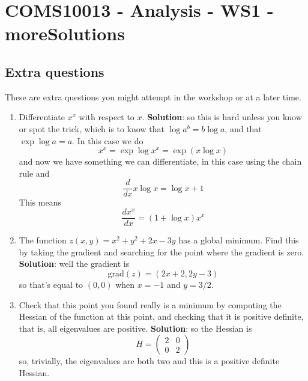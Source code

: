 \documentclass[11pt,a4paper]{scrartcl}
\begin{document}
\section*{COMS10013 - Analysis - WS1 - moreSolutions}

\subsection*{Extra questions}

These are extra questions you might attempt in the workshop or at a later time.

\begin{enumerate}

\item Differentiate $x^x$ with respect to $x$. \textbf{Solution}: so this is hard unless you know or spot the trick, which is to know that $\log a^b=b\log a$, and that $\exp{\log{a}}=a$. In this case we do
  \begin{equation}
    x^x=\exp{\log{x^x}}=\exp{\left(x\log{x}\right)}
  \end{equation}
  and now we have something we can differentiate, in this case using the chain rule and
  \begin{equation}
    \frac{d}{dx}x\log{x}=\log{x}+1
  \end{equation}
  This means
  \begin{equation}
    \frac{dx^x}{dx}=(1+\log{x})x^x
  \end{equation}
  

\item The function $z(x, y) = x^2 + y^2 + 2x - 3y$ has a global minimum. Find this by taking
  the gradient and searching for the point where the gradient is zero. \textbf{Solution}: well the gradient is
  \begin{equation}
    \text{grad}(z)=(2x+2,2y-3)
  \end{equation}
  so that's equal to $(0,0)$ when $x=-1$ and $y=3/2$. 
\item Check that this point you found really is a minimum by computing the Hessian of the
  function at this point, and checking that it is positive definite, that is, all eigenvalues are positive. \textbf{Solution}: so the Hessian is
  \begin{equation}
    H=\left(\begin{array}{cc}2&0\\0&2\end{array}\right)
  \end{equation}
  so, trivially, the eigenvalues are both two and this is a positive definite Hessian.

\end{enumerate}
\end{document}
